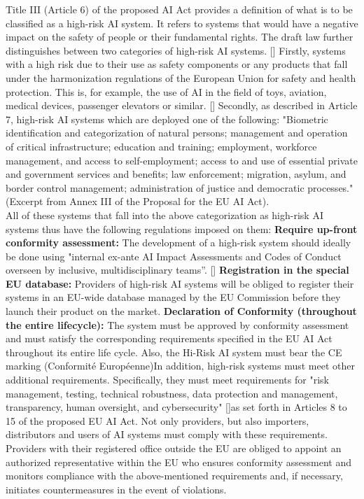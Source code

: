     Title III (Article 6) of the proposed AI Act provides a definition of what is to be classified as a high-risk AI system. It refers to systems that would have a negative impact on the safety of people or their fundamental rights. The draft law further distinguishes between two categories of high-risk AI systems.  [\citet{madiega2021artificial}] Firstly, systems with a high risk due to their use as safety components or any products that fall under the harmonization regulations of the European Union for safety and health protection. This is, for example, the use of AI in the field of toys, aviation, medical devices, passenger elevators or similar. [\citet{ebers2021standardizing}] Secondly, as described in Article 7, high-risk AI systems which are deployed one of the following: "Biometric identification and categorization of natural persons; management and operation of critical infrastructure; education and training; employment, workforce management, and access to self-employment; access to and use of essential private and government services and benefits; law enforcement; migration, asylum, and border control management; administration of justice and democratic processes." (Excerpt from Annex III of the Proposal for the EU AI Act).\\ \newline
    All of these systems that fall into the above categorization as high-risk AI systems thus have the following regulations imposed on them: \textbf{Require up-front conformity assessment:} The development of a high-risk system should ideally be done using "internal ex-ante AI Impact Assessments and Codes of Conduct overseen by inclusive, multidisciplinary teams”. [\citet{kop2021eu}]
    \textbf{Registration in the special EU database:} Providers of high-risk AI systems will be obliged to register their systems in an EU-wide database managed by the EU Commission before they launch their product on the market. \textbf{Declaration of Conformity (throughout the entire lifecycle):} The system must be approved by conformity assessment and must satisfy the corresponding requirements specified in the EU AI Act throughout its entire life cycle. Also, the Hi-Risk AI system must bear the CE marking (Conformité Européenne)\newline In addition, high-risk systems must meet other additional requirements. Specifically, they must meet requirements for "risk management, testing, technical robustness, data protection and management, transparency, human oversight, and cybersecurity" [\citet{madiega2021artificial}]as set forth in Articles 8 to 15 of the proposed EU AI Act. Not only providers, but also importers, distributors and users of AI systems must comply with these requirements. Providers with their registered office outside the EU are obliged to appoint an authorized representative within the EU who ensures conformity assessment and monitors compliance with the above-mentioned requirements and, if necessary, initiates countermeasures in the event of violations.
\newline\newline
